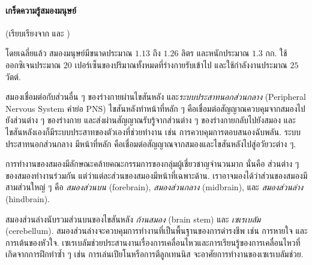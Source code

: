 {\small
	\begin{shaded}
		\paragraph{\small เกร็ดความรู้สมองมนุษย์}
		(เรียบเรียงจาก \cite{NIND} \cite{BuddhasBrain} และ \cite{Wikipedia})
		
		โดยเฉลี่ยแล้ว สมองมนุษย์มีขนาดประมาณ $1.13$ ถึง $1.26$ ลิตร และหนักประมาณ $1.3$ กก.
		ใช้ออกซิเจนประมาณ $20$ เปอร์เซ็นของปริมาณทั้งหมดที่ร่างกายรับเข้าไป
		และใช้กำลังงานประมาณ $25$ วัตต์\cite{GodwinCham2012a}.
		
		สมองเชื่อมต่อกับส่วนอื่น ๆ ของร่างกายผ่านไขสันหลัง 
		และ\textit{ระบบประสาทนอกส่วนกลาง} (Peripheral Nervous System คำย่อ PNS) 
		ไขสันหลังทำหน้าที่หลัก ๆ คือเชื่อมต่อสัญญาณควบคุมจากสมองไปยังส่วนต่าง ๆ ของร่างกาย และส่งผ่านสัญญาณรับรู้จากส่วนต่าง ๆ ของร่างกายกลับไปยังสมอง
		และไขสันหลังเองก็มีระบบประสาทของตัวเองที่ช่วยทำงาน เช่น การควบคุมการตอบสนองฉับพลัน.
		ระบบประสาทนอกส่วนกลาง มีหน้าที่หลัก
		คือเชื่อมต่อสัญญาณจากสมองและไขสันหลังไปสู่อวัยวะต่าง ๆ.
		
		การทำงานของสมองมีลักษณะคล้ายคณะกรรมการของกลุ่มผู้เชี่ยวชาญจำนวนมาก
		นั่นคือ ส่วนต่าง ๆ ของสมองทำงานร่วมกัน แต่ว่าแต่ละส่วนของสมองมีหน้าที่เฉพาะด้าน.
		เราอาจมองได้ว่าส่วนของสมองมีสามส่วนใหญ่ ๆ คือ \textit{สมองส่วนบน} (forebrain), \textit{สมองส่วนกลาง} (midbrain), และ \textit{สมองส่วนล่าง} (hindbrain).
		
		สมองส่วนล่างนับรวมส่วนบนของไขสันหลัง \textit{ก้านสมอง} (brain stem) และ \textit{เซเรเบลัม} (cerebellum).
		สมองส่วนล่างจะควบคุมการทำงานที่เป็นพื้นฐานของการดำรงชีพ เช่น การหายใจ และการเต้นของหัวใจ.
		เซเรเบลัมช่วยประสานงานเรื่องการเคลื่อนไหวและการเรียนรู้ของการเคลื่อนไหวที่เกิดจากการฝึกทำซ้ำ ๆ เช่น 
		การเล่นเปียโนหรือการตีลูกเทนนิส จะอาศัยการทำงานของเซเรเบลัมช่วย.
		

\end{shaded}}
